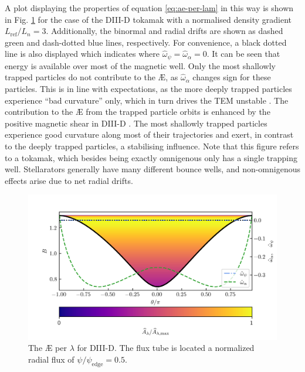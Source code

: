 A plot displaying the properties of equation \eqref{eq:ae-per-lam} in this way is shown in Fig. \ref{fig:AE_per_bw_D3D} for the case of the DIII-D tokamak with a normalised density gradient $L_\mathrm{ref}/L_n = 3$. Additionally, the binormal and radial drifts are shown as dashed green and dash-dotted blue lines, respectively. For convenience, a black dotted line is also displayed which indicates where $\hat{\omega}_\psi = \hat{\omega}_\alpha = 0$. It can be seen that energy is available over most of the magnetic well. Only the most shallowly trapped particles do not contribute to the \AE{}, as $\hat{\omega}_\alpha$ changes sign for these particles. This is in line with expectations, as the more deeply trapped particles experience ``bad curvature'' only, which in turn drives the TEM unstable \citep{Proll2012ResilienceInstabilities,Helander2017AvailablePlasmas}. The contribution to the \AE{} from the trapped particle orbits is enhanced by the positive magnetic shear in DIII-D \citep{connor1983effect}. The most shallowly trapped particles experience good curvature along most of their trajectories and exert, in contrast to the deeply trapped particles, a stabilising influence. Note that this figure refers to a tokamak, which besides being exactly omnigenous only has a single trapping well. Stellarators generally have many different bounce wells, and non-omnigenous effects arise due to net radial drifts.
\begin{figure}
    \centering
    \includegraphics[width=\textwidth]{3_chapters/1_papers/AE-TE/figures/AE_per_lam_D3D.png}
    \caption{The \AE{} per $\lambda$ for DIII-D. The flux tube is located a normalized radial flux of $\psi/\psi_\mathrm{edge}=0.5$.}
    \label{fig:AE_per_bw_D3D}
\end{figure}
\par 
